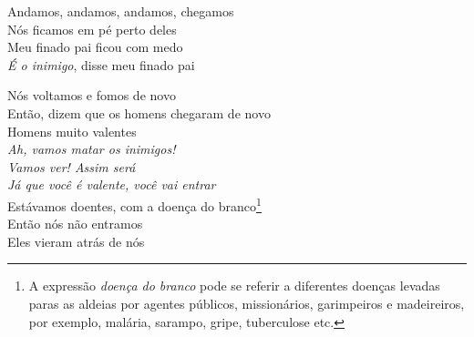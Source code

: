  \smallskip
 \begin{center}\end{center}
 \smallskip
 
\noindent   Andamos, andamos, andamos, chegamos\\
  Nós ficamos em pé perto deles\\
  Meu finado pai ficou com medo\\
  \textit{É o inimigo}, disse meu finado pai
 
 \smallskip
 \begin{center}\end{center}
 \smallskip
 
\noindent   Nós voltamos e fomos de novo\\
  Então, dizem que os homens chegaram de novo\\
  Homens muito valentes\\
  \textit{Ah, vamos matar os inimigos!}\\
  \textit{Vamos ver! Assim será}\\
  \textit{Já que você é valente, você vai entrar}\\
  Estávamos doentes, com a doença do branco\footnote{A expressão
   \textit{doença do branco} pode se referir a diferentes doenças levadas
   paras as aldeias por agentes públicos, missionários, garimpeiros e
   madeireiros, por exemplo, malária, sarampo, gripe, tuberculose etc.}\\
  Então nós não entramos\\
  Eles vieram atrás de nós
 
 \smallskip
 \begin{center}\end{center}
 \smallskip
 
